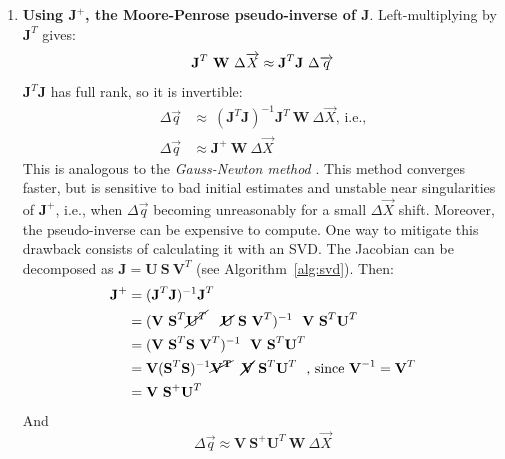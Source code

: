 \begin{enumerate}[itemsep=0em, topsep=0em, leftmargin=*]
    \item \textbf{Using $\textbf{J}^+$, the Moore-Penrose pseudo-inverse of J}. Left-multiplying by $\textbf{J}^T$ gives:
    \begin{equation}
        \textbf{J}^T \ \textbf{W} \ \Delta\overrightarrow{X} \approx \textbf{J}^T \textbf{J} \ \Delta\overrightarrow{q}\\
    \end{equation}
    $\textbf{J}^T \textbf{J}$ has full rank, so it is invertible:
    \begin{equation}\label{eq:pseudoinv}
      \begin{aligned}
        \Delta \overrightarrow{q} &\approx \ (\textbf{J}^T \textbf{J})^{-1} \textbf{J}^T \ \textbf{W} \ \Delta\overrightarrow{X} \text{, i.e.,} \\
        \Delta \overrightarrow{q} &\approx \textbf{J}^+ \ \textbf{W} \ \Delta\overrightarrow{X} 
      \end{aligned}
    \end{equation} 
    This is analogous to the \emph{Gauss-Newton method} \cite{Nocedal1999}. This method converges faster, but is sensitive to bad initial estimates and unstable near singularities of $\textbf{J}^+$, i.e., when $\Delta \overrightarrow{q}$ becoming unreasonably for a small $\Delta \overrightarrow{X}$ shift. Moreover, the pseudo-inverse can be expensive to compute. One way to mitigate this drawback consists of calculating it with an SVD. The Jacobian can be decomposed as $\textbf{J} = \textbf{U} \ \textbf{S} \ \textbf{V}^T$ (see Algorithm~\ref{alg:svd}). Then:
    \begin{equation}
          \begin{aligned}
          \textbf{J}^+
          & = (\textbf{J}^T \textbf{J})^{-1} \textbf{J}^T \\
          & = (\textbf{V} \ \textbf{S}^T \cancel{\textbf{U}^T} \ \ \
          \cancel{\textbf{U}} \ \textbf{S} \ \textbf{V}^T)^{-1} \ \  
          \textbf{V} \ \textbf{S}^T \textbf{U}^T \ \ \\
          & = (\textbf{V} \ \textbf{S}^T\textbf{S}\ \textbf{V}^T)^{-1} \ \  
          \textbf{V} \ \textbf{S}^T \textbf{U}^T \ \ \\
          & = \textbf{V} (\textbf{S}^T\textbf{S})^{-1} \cancel{\mathbf{V^T}} \ \  
          \cancel{\textbf{V}} \ \textbf{S}^T \textbf{U}^T \ \ \text{, since }\textbf{V}^{-1}=\textbf{V}^T\\
          & = \textbf{V} \ \textbf{S}^{+} \textbf{U}^T \ \ \\
        \end{aligned}
      \end{equation}
      And 
      \begin{equation}
        \Delta \overrightarrow{q} \approx \textbf{V} \ \textbf{S}^{+} \textbf{U}^T \ \textbf{W} \ \Delta\overrightarrow{X} 
      \end{equation}


\end{enumerate}
